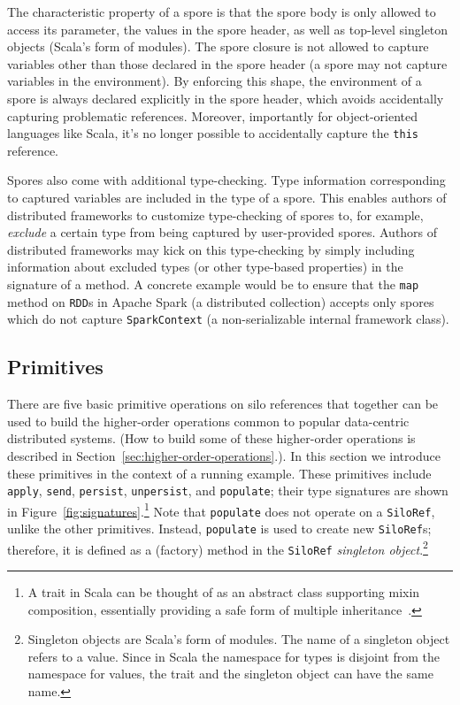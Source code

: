 \documentclass{jfp1}
\begin{document}
\vspace{3mm}
The characteristic property of a spore is that the spore body is only allowed to
access its parameter, the values in the spore header, as well as top-level
singleton objects (Scala's form of modules). The spore closure is not allowed to
capture variables other than those declared in the spore header (\ie a spore may
not capture variables in the environment). By enforcing this shape, the
environment of a spore is always declared explicitly in the spore header, which
avoids accidentally capturing problematic references. Moreover, importantly for
object-oriented languages like Scala, it's no longer possible to accidentally
capture the \verb|this| reference.

Spores also come with additional type-checking. Type information corresponding
to captured variables are included in the type of a spore. This enables authors
of distributed frameworks to customize type-checking of spores to, for example,
{\em exclude} a certain type from being captured by user-provided spores.
Authors of distributed frameworks may kick on this type-checking by simply
including information about excluded types (or other type-based properties) in
the signature of a method. A concrete example would be to ensure that the
\verb|map| method on \verb|RDD|s in Apache Spark (a distributed collection)
accepts only spores which do not capture \verb|SparkContext| (a non-serializable
internal framework class).



\subsection{Primitives}
\label{sec:primitives}

There are five basic primitive operations on silo references that
together can be used to build the higher-order operations common to
popular data-centric distributed systems. (How to build some of these
higher-order operations is described in
Section~\ref{sec:higher-order-operations}.). In this section we
introduce these primitives in the context of a running example. These
primitives include \verb|apply|, \verb|send|, \verb|persist|,
\verb|unpersist|, and \verb|populate|; their type signatures are shown
in Figure~\ref{fig:signatures}.\footnote{A trait in Scala can be
  thought of as an abstract class supporting mixin composition,
  essentially providing a safe form of multiple
  inheritance~\cite{OderskyZ05}.}  Note that \verb|populate| does not
operate on a \verb|SiloRef|, unlike the other primitives. Instead,
\verb|populate| is used to create new \verb|SiloRef|s; therefore, it
is defined as a (factory) method in the \verb|SiloRef| {\em singleton
  object}.\footnote{Singleton objects are Scala's form of modules. The
  name of a singleton object refers to a value. Since in Scala the
  namespace for types is disjoint from the namespace for values, the
  trait and the singleton object can have the same name.}
\end{document}
